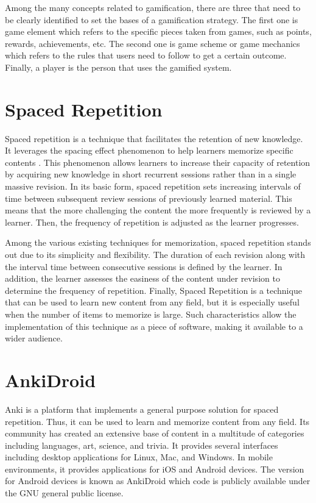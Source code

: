 Among the many concepts related to gamification, there are three that need to be clearly identified to set the bases of a gamification strategy. The first one is game element which refers to the specific pieces taken from games, such as points, rewards, achievements, etc. The second one is game scheme or game mechanics which refers to the rules that users need to follow to get a certain outcome. Finally, a player is the person that uses the gamified system.

\section{Spaced Repetition}
Spaced repetition is a technique that facilitates the retention of new knowledge. It leverages the spacing effect phenomenon to help learners memorize specific contents \citep{hintzman1974theoretical}. This phenomenon allows learners to increase their capacity of retention by acquiring new knowledge in short recurrent sessions rather than in a single massive revision. In its basic form, spaced repetition sets increasing intervals of time between subsequent review sessions of previously learned material. This means that the more challenging the content the more frequently is reviewed by a learner. Then, the frequency of repetition is adjusted as the learner progresses.

Among the various existing techniques for memorization, spaced repetition stands out due to its simplicity and flexibility. The duration of each revision along with the interval time between consecutive sessions is defined by the learner. In addition, the learner assesses the easiness of the content under revision to determine the frequency of repetition. Finally, Spaced Repetition is a technique that can be used to learn new content from any field, but it is especially useful when the number of items to memorize is large. Such characteristics allow the implementation of this technique as a piece of software, making it available to a wider audience.

\section{AnkiDroid}
Anki is a platform that implements a general purpose solution for spaced repetition. Thus, it can be used to learn and memorize content from any field. Its community has created an extensive base of content in a multitude of categories including languages, art, science, and trivia. It provides several interfaces including desktop applications for Linux, Mac, and Windows. In mobile environments, it provides applications for iOS and Android devices. The version for Android devices is known as AnkiDroid which code is publicly available under the GNU general public license.

